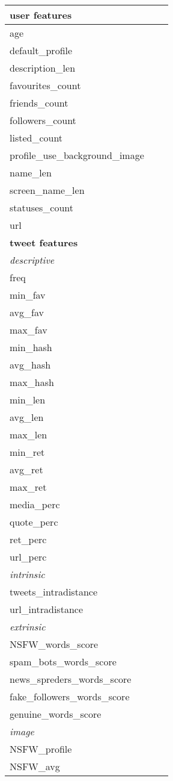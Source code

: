 \begin{center}
	\begin{tabular}{lll}
		\hline\hline
		\textbf{user features}\\
		\hline\hline
		age\\
		default\_profile\\
		description\_len\\
		favourites\_count\\
		friends\_count\\
		followers\_count\\
		listed\_count\\
		profile\_use\_background\_image\\
		name\_len\\
		screen\_name\_len\\
		statuses\_count\\
		url\\
		\hline\hline
		\textbf{tweet  features}\\
		\hline\hline
		\textit{descriptive}\\
		\hline
		freq\\
		min\_fav\\
		avg\_fav\\
		max\_fav\\
		min\_hash\\
		avg\_hash\\
		max\_hash\\
		min\_len\\
		avg\_len\\
		max\_len\\
		min\_ret\\
		avg\_ret\\
		max\_ret\\
		media\_perc\\
		quote\_perc\\
		ret\_perc\\
		url\_perc\\
		\hline
		\textit{intrinsic}\\
		\hline
		tweets\_intradistance\\
		url\_intradistance\\
		\hline
		\textit{extrinsic}\\
		\hline
		NSFW\_words\_score\\
		spam\_bots\_words\_score\\
		news\_spreders\_words\_score\\
		fake\_followers\_words\_score\\
		genuine\_words\_score\\
		\hline
		\textit{image}\\
		\hline
		NSFW\_profile\\
		NSFW\_avg\\\hline
	\end{tabular}
\end{center}
\normalsize



